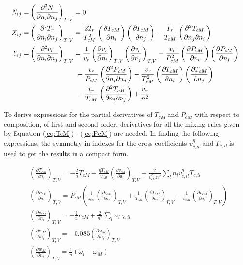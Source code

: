 \documentclass[english]{../thermomemo/thermomemo}
\numberwithin{equation}{section}
\newcommand*{\pder}[2]{\left(\frac{\partial #1}{\partial #2}\right)}
\newcommand*{\pdcross}[3]{\left(\frac{\partial^2 #1}{\partial #2 \partial #3}\right)}
\newcommand*{\reff}[1]{(\ref{#1})}
\begin{document}
\begin{align}
 \phantom{Y_ij}
 \label{eq:N_ij}
 & \begin{aligned}
  \mathllap {N_{ij}} & = \pdcross{N}{n_i}{n_j}_{T,V} = 0 
  \end{aligned} \\
 \label{eq:Tr_ij}
 & \begin{aligned}
  \mathllap{X_{ij}} & = \pdcross{T_r}{n_i}{n_j}_{T,V} = \frac{2T_r}{T_{cM}^2} \pder{T_{cM}}{n_i} \pder{T_{cM}}{n_j} - \frac{T_r}{T_{cM}} \pdcross{T_{cM}}{n_j}{n_i}
  \end{aligned} \\
  \label{eq:vr_ij}
 &\begin{aligned}
  \mathllap{Y_{ij}} & = \pdcross{v_r}{n_i}{n_j}_{T,V} = \frac{1}{v_r} \pder{v_r}{n_i}_{T,V} 			    \pder{v_r}{n_j}_{T,V} - \frac{v_r}{P_{cM}^2} \pder{P_{cM}}{n_i} \pder{P_{cM}}{n_j} \\
	& \qquad  \qquad  \qquad \qquad + \frac{v_r}{P_{cM}} \pdcross{P_{cM}}{n_i}{n_j} + \frac{v_r}{T_{cM}^2} \pder{T_{cM}}{n_i} \pder{T_{cM}}{n_j} \\
	& \qquad  \qquad  \qquad \qquad - \frac{v_r}{T_{cM}} \pdcross{T_{cM}}{n_i}{n_j} + \frac{v_r}{n^2}
 \end{aligned}  
\end{align}

To derive expressions for the partial derivatives of $T_{cM} $ and $P_{cM}$ with respect to composition, of first and second order, derivatives for all the mixing rules given by Equation \reff{eq:TcM} - \reff{eq:PcM} are needed. In finding the following expressions, the symmetry in indexes for the cross coefficients $v_{c,il}^\eta$ and $T_{c,il}$ is used to get the results in a compact form.

\begin{align}
\label{eq:TcM_ni}
& \left(\frac{\partial T_{cM}}{\partial n_i} \right)_{T,V} =-\frac{2}{n}T_{cM} -\frac{\eta T_{cM}}{v_{cM}} \pder{v_{cM}}{n_i}_{T,V}+ \frac{2}{v_{cM}^{\eta} n^2} \sum_l n_l v_{c,il}^\eta T_{c,il} \\
\label{eq:PcM_ni}
& \pder{P_{cM}}{n_i}_{T,V} = P_{cM} \left(\frac{1}{z_{cM}} \pder{z_{cM}}{n_i}_{T,V} + \frac{1}{T_{cM}} \pder{T_{cM}}{n_i}_{T,V} - \frac{1}{v_{cM}} \pder{v_{cM}}{n_i}_{T,V} \right) \\
\label{eq:vcM_ni}
& \left(\frac{\partial v_{cM}}{\partial n_i} \right)_{T,V} = -\frac{2}{n}v_{cM} + \frac{2}{n^2} \sum_l n_l v_{c,il}\\
\label{eq:zcM_ni}
& \pder{z_{cM}}{n_i}_{T,V} = -0.085 \pder{\omega_M}{n_i}_{T,V} \\
\label{eq:wM_ni}
& \left(\frac{\partial w_{M}}{\partial n_i} \right)_{T,V} = \frac{1}{n} (\omega_i - \omega_M)
\end{align}
\end{document}
